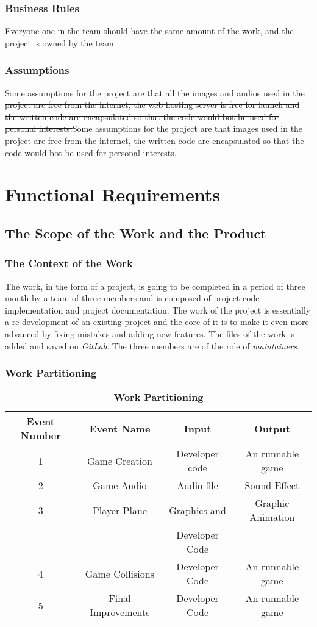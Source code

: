 \documentclass[12pt, titlepage]{article}
\begin{document}
\subsubsection{Business Rules}
Everyone one in the team should have the same amount of the work, and the project is owned by the team.
\subsubsection{Assumptions}
\sout{Some assumptions for the project are that all the images and audios used in the project are free from the internet, the web-hosting server is free for launch and the written code are encapsulated so that the code would bot be used for personal interests.}{\color{red}Some assumptions for the project are that images used in the project are free from the internet, the written code are encapsulated so that the code would bot be used for personal interests.}
\section{Functional Requirements}

\subsection{The Scope of the Work and the Product}
\subsubsection{The Context of the Work}
The work, in the form of a project, is going to be completed in a period of three month by a team of three members and is composed of project code implementation and project documentation. The work of the project is essentially a re-development of an existing project and the core of it is to make it even more advanced by fixing mistakes and adding new features.
The files of the work is added and saved on \emph{GitLab}. The three members are of the role of \emph{maintainers}.
\subsubsection{Work Partitioning}
\qquad
\begin{table}[!htbp]
\caption{\bf Work Partitioning}
\begin{tabular}{|c|c|c|c|}
    \hline
    \textbf{Event Number}&\textbf{Event Name}&\textbf{Input}&\textbf{Output} \\
    \hline
    1&Game Creation&Developer code&An runnable game\\
    \hline
    2&Game Audio&Audio file&Sound Effect\\
    \hline
    3&Player Plane&Graphics and&Graphic Animation\\
    &&Developer Code&\\
    \hline
    4&Game Collisions&Developer Code&An runnable game\\
    \hline
    5&Final Improvements&Developer Code&An runnable game\\
    \hline
\end{tabular}
\end{table}
\end{document}
